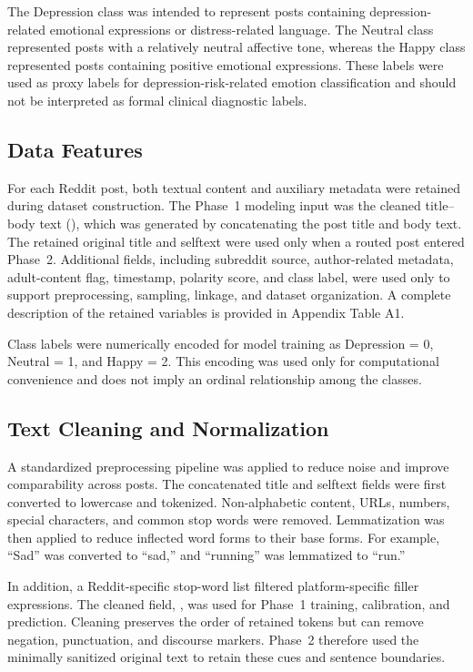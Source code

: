 \documentclass{ieeeaccess}
\begin{document}
The Depression class was intended to represent posts containing depression-related emotional expressions or distress-related language. The Neutral class represented posts with a relatively neutral affective tone, whereas the Happy class represented posts containing positive emotional expressions. These labels were used as proxy labels for depression-risk-related emotion classification and should not be interpreted as formal clinical diagnostic labels.

\subsection{Data Features}

For each Reddit post, both textual content and auxiliary metadata were retained during dataset construction. The Phase~1 modeling input was the cleaned title--body text (), which was generated by concatenating the post title and body text. The retained original title and selftext were used only when a routed post entered Phase~2. Additional fields, including subreddit source, author-related metadata, adult-content flag, timestamp, polarity score, and class label, were used only to support preprocessing, sampling, linkage, and dataset organization. A complete description of the retained variables is provided in Appendix Table A1.

Class labels were numerically encoded for model training as Depression = 0, Neutral = 1, and Happy = 2. This encoding was used only for computational convenience and does not imply an ordinal relationship among the classes.

\subsection{Text Cleaning and Normalization}

A standardized preprocessing pipeline was applied to reduce noise and improve comparability across posts. The concatenated title and selftext fields were first converted to lowercase and tokenized. Non-alphabetic content, URLs, numbers, special characters, and common stop words were removed. Lemmatization was then applied to reduce inflected word forms to their base forms. For example, ``Sad'' was converted to ``sad,'' and ``running'' was lemmatized to ``run.''

In addition, a Reddit-specific stop-word list filtered platform-specific filler expressions. The cleaned field, , was used for Phase~1 training, calibration, and prediction. Cleaning preserves the order of retained tokens but can remove negation, punctuation, and discourse markers. Phase~2 therefore used the minimally sanitized original text to retain these cues and sentence boundaries.
\end{document}
